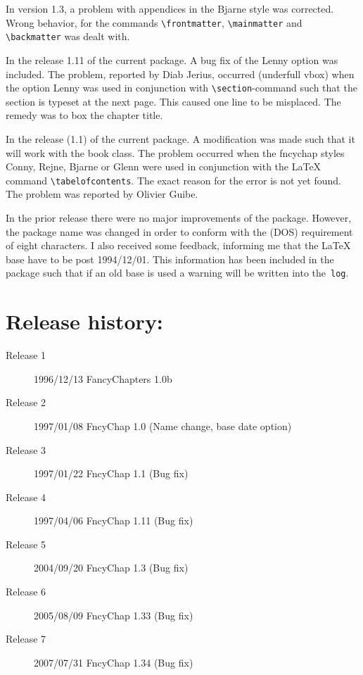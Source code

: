 \documentclass{report}
\newcommand{\A}[1]{{\texttt{\textbackslash #1}}}
\begin{document}
      In version 1.3, a problem with appendices in the Bjarne style was
      corrected. Wrong behavior, for the commands
      \verb+\frontmatter+, \verb+\mainmatter+ and  \verb+\backmatter+
      was dealt with. 

      In the release 1.11 of the current package. A bug
      fix of the Lenny option was included. The problem, reported
      by Diab Jerius, occurred (underfull vbox) when the option Lenny
      was used in conjunction with \A{section}-command such that the
      section is typeset at the next page. This caused one line to be
      misplaced. The remedy was to box the chapter title.

      In the release (1.1) of the current package. A
      modification was made such that it will work with the book
      class. The problem occurred when the fncychap styles Conny,
      Rejne, Bjarne or Glenn were used in conjunction with the
      \LaTeX{} command \A{tabelofcontents}. The exact reason for the
      error is not yet found. The problem was reported by Olivier Guibe.

      In the prior release there were no major improvements of the
      package. However, the package name was changed in order to
      conform with the (DOS) requirement of eight characters. I also
      received some feedback, informing me that the \LaTeX{} base have
      to be post 1994/12/01.  This information has been included in
      the package such that if an old base is used a warning will be
      written into the~\texttt{log}.

      \section*{Release history:}
      \begin{description}
        \item[Release 1] 1996/12/13 FancyChapters 1.0b
        \item[Release 2] 1997/01/08 FncyChap 1.0 (Name change, base
          date option)
        \item[Release 3] 1997/01/22 FncyChap 1.1 (Bug fix)
        \item[Release 4] 1997/04/06 FncyChap 1.11 (Bug fix)
        \item[Release 5] 2004/09/20 FncyChap 1.3 (Bug fix)
        \item[Release 6] 2005/08/09 FncyChap 1.33 (Bug fix)
        \item[Release 7] 2007/07/31 FncyChap 1.34 (Bug fix)
      \end{description}
\end{document}
